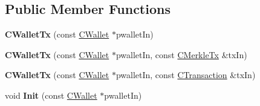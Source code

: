 \subsection*{Public Member Functions}
\begin{DoxyCompactItemize}
\item 
\mbox{\label{class_c_wallet_tx_a0b1a0f58fbe4c65d47136e1a650cee84}} 
{\bfseries C\+Wallet\+Tx} (const \mbox{\hyperlink{class_c_wallet}{C\+Wallet}} $\ast$pwallet\+In)
\item 
\mbox{\label{class_c_wallet_tx_a8e58ffb8a69ea68fc366b8a53ef345ef}} 
{\bfseries C\+Wallet\+Tx} (const \mbox{\hyperlink{class_c_wallet}{C\+Wallet}} $\ast$pwallet\+In, const \mbox{\hyperlink{class_c_merkle_tx}{C\+Merkle\+Tx}} \&tx\+In)
\item 
\mbox{\label{class_c_wallet_tx_a626a5d41502247ea13b0c90694455468}} 
{\bfseries C\+Wallet\+Tx} (const \mbox{\hyperlink{class_c_wallet}{C\+Wallet}} $\ast$pwallet\+In, const \mbox{\hyperlink{class_c_transaction}{C\+Transaction}} \&tx\+In)
\item 
\mbox{\label{class_c_wallet_tx_ad207b1e6b355946842a126bc14c7e793}} 
void {\bfseries Init} (const \mbox{\hyperlink{class_c_wallet}{C\+Wallet}} $\ast$pwallet\+In)
\item 
\mbox{\label{class_c_wallet_tx_a9bd09e08a3c2f729d196f7bc39dd19ab}} 

\end{DoxyCompactItemize}
